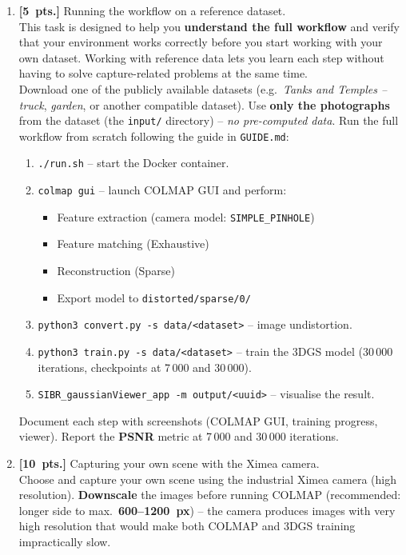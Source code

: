 \documentclass{article}
\begin{document}
\begin{enumerate}

\item \textbf{[5~pts.]} Running the workflow on a reference dataset.\\
This task is designed to help you \textbf{understand the full workflow} and verify
that your environment works correctly before you start working with your own dataset.
Working with reference data lets you learn each step without having to solve
capture-related problems at the same time.\\[4pt]
Download one of the publicly available datasets (e.g.\ \textit{Tanks and
Temples -- truck}, \textit{garden}, or another compatible dataset).
Use \textbf{only the photographs} from the dataset (the \texttt{input/} directory) --
\emph{no pre-computed data}.
Run the full workflow from scratch following the guide in \texttt{GUIDE.md}:

\begin{enumerate}
    \item \texttt{./run.sh} -- start the Docker container.
    \item \texttt{colmap gui} -- launch COLMAP GUI and perform:
        \begin{itemize}
            \item Feature extraction (camera model: \texttt{SIMPLE\_PINHOLE})
            \item Feature matching (Exhaustive)
            \item Reconstruction (Sparse)
            \item Export model to \texttt{distorted/sparse/0/}
        \end{itemize}
    \item \texttt{python3 convert.py -s data/<dataset>} -- image undistortion.
    \item \texttt{python3 train.py -s data/<dataset>} -- train the 3DGS model
          (30\,000 iterations, checkpoints at 7\,000 and 30\,000).
    \item \texttt{SIBR\_gaussianViewer\_app -m output/<uuid>} -- visualise the result.
\end{enumerate}

Document each step with screenshots (COLMAP GUI, training progress, viewer).
Report the \textbf{PSNR} metric at 7\,000 and 30\,000 iterations.

\item \textbf{[10~pts.]} Capturing your own scene with the Ximea camera.\\
Choose and capture your own scene using the industrial Ximea camera (high resolution).
\textbf{Downscale} the images before running COLMAP
(recommended: longer side to max.\ \textbf{600--1200~px}) -- the camera produces
images with very high resolution that would make both COLMAP and 3DGS training
impractically slow.


\end{enumerate}
\end{document}
